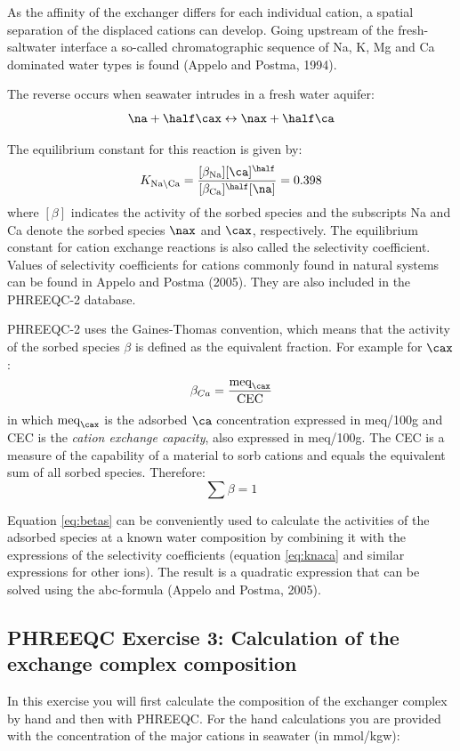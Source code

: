 As the affinity of the exchanger differs for each individual cation, a spatial separation of the displaced cations can develop. Going upstream of the fresh- saltwater interface a so-called chromatographic sequence of Na, K, Mg and Ca dominated water types is found (Appelo and Postma, 1994). 

The reverse occurs when seawater intrudes in a fresh water aquifer:
\begin{equation}
\na + \half \cax \leftrightarrow \nax + \half \ca
\end{equation}

The equilibrium constant for this reaction is given by:
\begin{equation}
K_{\text{Na} \backslash \text{Ca}} = \frac{[\beta_{\text{Na}}][\ca]^{\half}}{[\beta_{\text{Ca}}]^{\half}[\na]} = 0.398
\label{eq:knaca}
\end{equation}
where $[\beta]$ indicates the activity of the sorbed species and the subscripts Na and Ca denote the sorbed species $\nax$ and $\cax$, respectively. The equilibrium constant for cation exchange reactions is also called the selectivity coefficient. Values of selectivity coefficients for cations commonly found in natural systems can be found in Appelo and Postma (2005). They are also included in the PHREEQC-2 database.

PHREEQC-2 uses the Gaines-Thomas convention, which means that the activity of the sorbed species $\beta$ is defined as the equivalent fraction. For example for $\cax$:
\begin{equation}
\beta_{Ca} = \frac{\text{meq}_{\cax}}{\text{CEC}}
\end{equation}
in which $\text{meq}_{\cax}$ is the adsorbed $\ca$ concentration expressed in meq/100g and CEC is the \textit{cation exchange capacity}, also expressed in meq/100g. The CEC is a measure of the capability of a material to sorb cations and equals the equivalent sum of all sorbed species. Therefore:
\begin{equation}
\sum \beta = 1
\label{eq:betas}
\end{equation}

Equation \ref{eq:betas} can be conveniently used to calculate the activities of the adsorbed species at a known water composition by combining it with the expressions of the selectivity coefficients (equation \ref{eq:knaca} and similar expressions for other ions). The result is a quadratic expression that can be solved using the abc-formula (Appelo and Postma, 2005).

\subsection{PHREEQC Exercise 3: Calculation of the exchange complex composition}
In this exercise you will first calculate the composition of the exchanger complex by hand and then with PHREEQC. For the hand calculations you are provided with the concentration of the major cations in seawater (in mmol/kgw):

